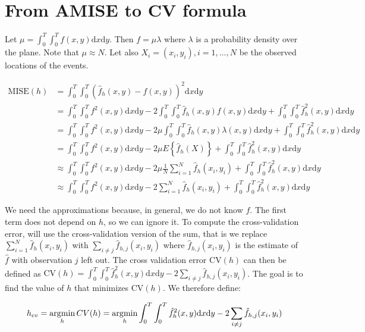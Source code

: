 
\section{From AMISE to CV formula}

\newcommand{\se}[2]{\ensuremath{(\hat{#1}_h{#2} - #1#2)^2}} %
\newcommand{\dbint}[5]{\ensuremath{\int_{#2}^{#3}\int_{#4}^{#5}{#1}\mathrm{d}x\mathrm{d}y}}
\newcommand{\fhhat}{\hat{f}_h}
\newcommand{\fhhatj}{\hat{f}_{h,j}}

Let \( \mu = \dbint{f(x,y)}{0}{T}{0}{T} \).
Then \( f = \mu \lambda \) where \( \lambda \) is a probability density over the plane.
Note that \( \mu \approx N \).
Let also \(X_i = (x_i, y_i), i = 1, \ldots, N \) be the observed locations of the events.

\begin{align*}
\mbox{MISE}(h) & = \dbint{\se{f}{(x,y)}}{0}{T}{0}{T} && \\
     & = \dbint{f^2(x,y)}{0}{T}{0}{T} - 2\dbint{\fhhat(x,y)f(x,y)}{0}{T}{0}{T} + \dbint{\fhhat^2(x,y)}{0}{T}{0}{T} && \\
     & = \dbint{f^2(x,y)}{0}{T}{0}{T} - 2 \mu \dbint{\fhhat(x,y)\lambda(x,y)}{0}{T}{0}{T} + \dbint{\fhhat^2(x,y)}{0}{T}{0}{T} && \\
     & = \dbint{f^2(x,y)}{0}{T}{0}{T} - 2 \mu E\left\{\fhhat(X)\right\} + \dbint{\fhhat^2(x,y)}{0}{T}{0}{T} && \\
     & \approx \dbint{f^2(x,y)}{0}{T}{0}{T} - 2 \mu \frac{1}{N} \sum_{i=1}^N{\fhhat(x_i,y_i)} + \dbint{\fhhat^2(x,y)}{0}{T}{0}{T} && \\
     & \approx \dbint{f^2(x,y)}{0}{T}{0}{T} - 2 \sum_{i=1}^N{\fhhat(x_i,y_i)} + \dbint{\fhhat^2(x,y)}{0}{T}{0}{T} &&
\end{align*}

We need the approximations because, in general, we do not know \(f\).
The first term does not depend on \(h\), so we can ignore it.
To compute the cross-validation error, will use the cross-validation version of the sum,
that is we replace \( \sum_{i=1}^N{\fhhat(x_i,y_i)} \) with \( \sum_{i \ne j}{\fhhatj(x_i,y_i)} \)
where \( \fhhatj(x_i,y_i) \) is the estimate of \(\hat{f}\) with observation \(j\) left out.
The cross validation error \( \mbox{CV}(h) \) can then be defined as
\( \mbox{CV}(h) = \dbint{\fhhat^2(x,y)}{0}{T}{0}{T} - 2 \sum_{i \ne j}{\fhhatj(x_i,y_i)} \).
The goal is to find the value of \(h\) that minimizes \( \mbox{CV}(h) \).
We therefore define:

\begin{equation}
    h_{cv} = \argmin_h{CV(h)} = \argmin_h{\dbint{\fhhat^2(x,y)}{0}{T}{0}{T} - 2 \sum_{i \ne j}{\fhhatj(x_i,y_i)}}
\end{equation}